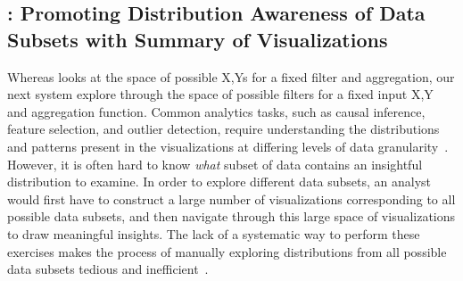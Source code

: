 \subsection{\sbd: Promoting Distribution Awareness of Data Subsets with Summary of Visualizations}
\par Whereas \seedb looks at the space of possible X,Ys for a fixed filter and aggregation, our next system \sbd explore through the space of possible filters for a fixed input X,Y and aggregation function. Common analytics tasks, such as causal inference, feature selection, and outlier detection, require understanding the distributions and patterns present in the visualizations at differing levels of data granularity~\cite{Anand2015,Heer2012,Wu2013}. However, it is often hard to know \textit{what} subset of data contains an insightful distribution to examine. In order to explore different data subsets, an analyst would first have to construct a large number of visualizations corresponding to all possible data subsets, and then navigate through this large space of visualizations to draw meaningful insights.  The lack of a systematic way to perform these exercises makes the process of manually exploring distributions from all possible data subsets tedious and inefficient~\cite{Sarawagi1998,Sarawagi2000}.
